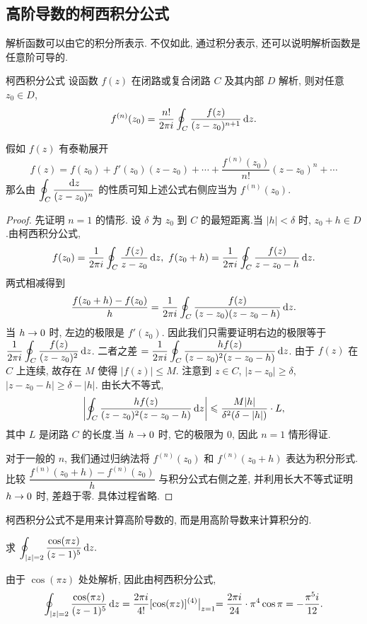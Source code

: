 \subsection{高阶导数的柯西积分公式}

解析函数可以由它的积分所表示.
不仅如此, 通过积分表示, 还可以说明\alert{解析函数是任意阶可导的}.

\begin{theorem}{柯西积分公式}
	设函数 $f(z)$ 在闭路或复合闭路 $C$ 及其内部 $D$ 解析, 则对任意 $z_0\in D$,
	\[f^{(n)}(z_0)=\frac{n!}{2\pi i}\oint_C\frac{f(z)}{(z-z_0)^{n+1}}\,\mathrm{d} z.\]
\end{theorem}

假如 $f(z)$ 有泰勒展开
\[f(z)=f(z_0)+f'(z_0)(z-z_0)+\cdots+\frac{f^{(n)}(z_0)}{n!}(z-z_0)^n+\cdots\]
那么由 $\displaystyle\oint_C \frac{\,\mathrm{d} z}{(z-z_0)^n}$ 的性质可知上述公式右侧应当为 $f^{(n)}(z_0)$.

\begin{proof}
	先证明 $n=1$ 的情形.
	设 $\delta$ 为 $z_0$ 到 $C$ 的最短距离.当 $|h|<\delta$ 时, $z_0+h\in D$.由柯西积分公式,
		\[f(z_0)=\frac1{2\pi i}\oint_C\frac{f(z)}{z-z_0}\diff z,\ 
		f(z_0+h)=\frac1{2\pi i}\oint_C\frac{f(z)}{z-z_0-h}\diff z.\]
	两式相减得到
		\[\frac{f(z_0+h)-f(z_0)}h=\frac1{2\pi i}\oint_C\frac{f(z)}{(z-z_0)(z-z_0-h)}\,\mathrm{d} z.\]
	当 $h\rightarrow 0$ 时, 左边的极限是 $f'(z_0)$. 因此我们只需要证明右边的极限等于 $\displaystyle\frac1{2\pi i}\oint_C\frac{f(z)}{(z-z_0)^2}\,\mathrm{d} z$.
	二者之差 $=\displaystyle\frac1{2\pi i}\oint_C\frac{h f(z)}{(z-z_0)^2(z-z_0-h)}\,\mathrm{d} z$.
	由于 $f(z)$ 在 $C$ 上连续, 故存在 $M$ 使得 $|f(z)|\le M$. 注意到 $z\in C$, $|z-z_0|\ge \delta$, $|z-z_0-h|\ge\delta-|h|$. 由长大不等式,
		\[\left|\oint_C\frac{h f(z)}{(z-z_0)^2(z-z_0-h)}\,\mathrm{d} z\right|\leqslant\frac{M|h|}{\delta^2(\delta-|h|)}\cdot L,\]
	其中 $L$ 是闭路 $C$ 的长度.当 $h\rightarrow0$ 时, 它的极限为 $0$, 因此 $n=1$ 情形得证.

	对于一般的 $n$, 我们通过归纳法将 $f^{(n)}(z_0)$ 和 $f^{(n)}(z_0+h)$ 表达为积分形式. 比较 $\dfrac{f^{(n)}(z_0+h)-f^{(n)}(z_0)}h$ 与积分公式右侧之差, 并利用长大不等式证明 $h\rightarrow 0$ 时, 差趋于零. 具体过程省略.
\end{proof}

\alert{柯西积分公式不是用来计算高阶导数的, 而是用高阶导数来计算积分的.}

\begin{example}
	求 $\displaystyle\oint_{|z|=2}\frac{\cos(\pi z)}{(z-1)^5}\,\mathrm{d} z.$
\end{example}

\begin{solution}
	由于 $\cos(\pi z)$ 处处解析,
	{因此由柯西积分公式,
		\[
		\oint_{|z|=2}\frac{\cos(\pi z)}{(z-1)^5}\,\mathrm{d} z
		=\frac{2\pi i}{4!}[\cos(\pi z)]^{(4)}\big|_{z=1}
		{=\frac{2\pi i}{24}\cdot \pi^4\cos \pi=-\frac{\pi^5 i}{12}.}
		\]}
\end{solution}

